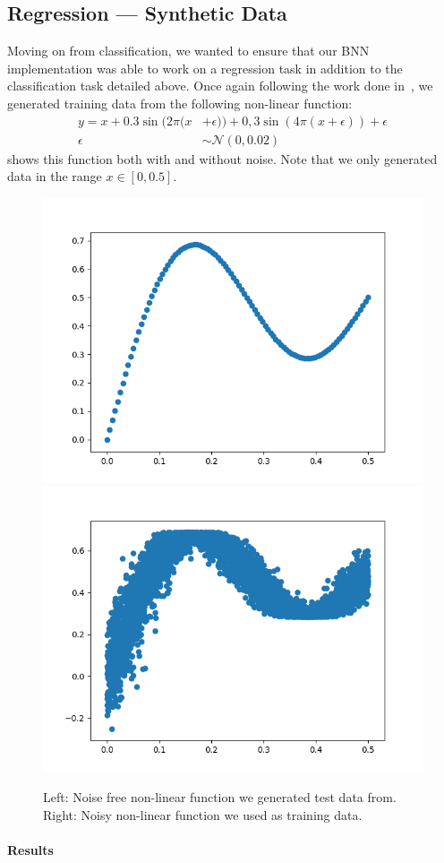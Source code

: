 \documentclass[11pt]{article}
\begin{document}
\subsection{Regression --- Synthetic Data}

Moving on from classification, we wanted to ensure that our BNN implementation
was able to work on a regression task in addition to the classification task
detailed above. Once again following the work done in~\cite{blundell}, we
generated training data from the following non-linear function:
%
\begin{align*}
  y = x + 0.3 \sin(2\pi (x &+ \epsilon)) + 0,3 \sin(4\pi (x + \epsilon))
  + \epsilon \\
  \epsilon &\sim \mathcal{N}(0, 0.02)
\end{align*}
%
 shows this function both with and without noise.  Note
that we only generated data in the range $x\in [0, 0.5]$.

\begin{figure}[H]
  \centering
  \includegraphics[width=.45\textwidth]{figures/regression_curve.png}
  \includegraphics[width=.45\textwidth]{figures/regression_curve_with_noise.png}
  \caption{Left: Noise free non-linear function we generated test data from.
  Right: Noisy non-linear function we used as training
  data.}\label{fig:reg_syth_data}
\end{figure}

\paragraph{Results} 
\end{document}
